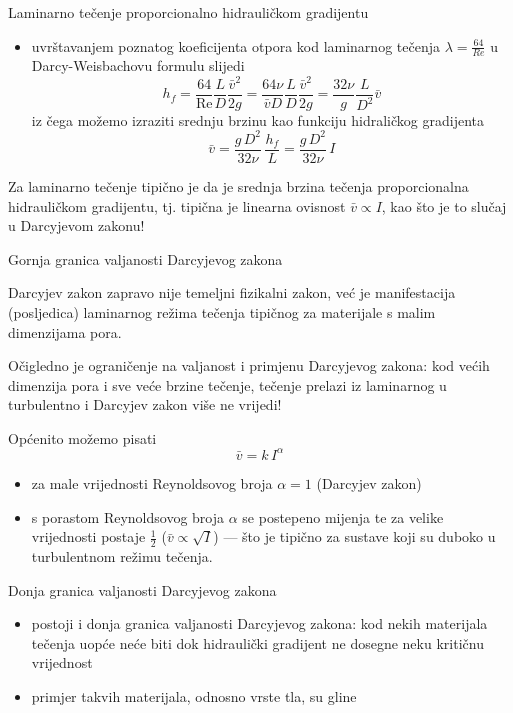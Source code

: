 \documentclass{beamer}
\begin{document}
%
\begin{frame}{Laminarno tečenje proporcionalno hidrauličkom gradijentu}
\begin{itemize}
\item uvrštavanjem poznatog koeficijenta otpora kod laminarnog tečenja $\lambda=\frac{64}{Re}$
u Darcy-Weisbachovu formulu slijedi 
\[
h_{f}=\frac{64}{\text{Re}}\frac{L}{D}\frac{\bar{v}^{2}}{2g}=\frac{64\nu}{\bar{v}D}\frac{L}{D}\frac{\bar{v}^{2}}{2g}=\frac{32\nu}{g}\frac{L}{D^{2}}\bar{v}
\]
iz čega možemo izraziti srednju brzinu kao funkciju hidraličkog gradijenta
\[
\bar{v}=\frac{g\,D^{2}}{32\nu}\,\frac{h_{f}}{L}=\frac{g\,D^{2}}{32\nu}\,I
\]
\end{itemize}
\begin{alertblock}{}
Za laminarno tečenje tipično je da je srednja brzina tečenja proporcionalna
hidrauličkom gradijentu, tj. tipična je linearna ovisnost $\bar{v}\propto I$,
kao što je to slučaj u Darcyjevom zakonu! 
\end{alertblock}
\end{frame}
%
\begin{frame}{Gornja granica valjanosti Darcyjevog zakona}
\begin{alertblock}{}
Darcyjev zakon zapravo nije temeljni fizikalni zakon, već je manifestacija
(posljedica) laminarnog režima tečenja tipičnog za materijale s malim
dimenzijama pora. 
\end{alertblock}
\begin{block}{}
Očigledno je ograničenje na valjanost i primjenu Darcyjevog zakona:
kod većih dimenzija pora i sve veće brzine tečenje, tečenje prelazi
iz laminarnog u turbulentno i Darcyjev zakon više ne vrijedi! 

\end{block}
Općenito možemo pisati
\[
\bar{v}=k\,I^{\alpha}
\]

\begin{itemize}
\item za male vrijednosti Reynoldsovog broja $\alpha=1$ (Darcyjev zakon) 
\item s porastom Reynoldsovog broja $\alpha$ se postepeno mijenja te za
velike vrijednosti postaje $\frac{1}{2}$ ($\bar{v}\propto\sqrt{I}$)
--- što je tipično za sustave koji su duboko u turbulentnom režimu
tečenja. 
\end{itemize}
\end{frame}
%
\begin{frame}{Donja granica valjanosti Darcyjevog zakona}
\begin{itemize}
\item postoji i donja granica valjanosti Darcyjevog zakona: kod nekih materijala
tečenja uopće neće biti dok hidraulički gradijent ne dosegne neku
kritičnu vrijednost 
\item primjer takvih materijala, odnosno vrste tla, su gline\vfill{}
 \vfill{}
 \vfill{}
 \vfill{}
 \vfill{}
 \vfill{}
 \vfill{}
 
\end{itemize}
\end{frame}
\end{document}
